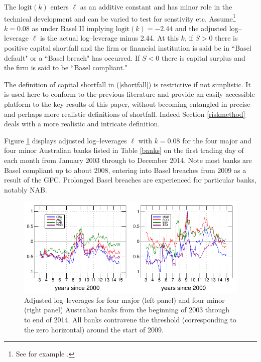 \documentclass[12pt]{article}
\newcommand{\logit}{\mathrm{logit}}
\newcommand{\eref}[1]{(\ref{#1})}
\newcommand{\fref}[1]{Figure \ref{#1}}
\newcommand{\sref}[1]{Section \ref{#1}}
\newcommand{\tref}[1]{Table \ref{#1}}
\begin{document}
The $\logit(k)$ enters $\ell$ as an additive constant and has  minor role in the technical development and can be varied to test for senstivity etc.  Assume\footnote{See for example \cite{brownlees2015}.} $k=0.08$ as under Basel II implying $\logit( k)=-2.44$ and the adjusted log--leverage $\ell$ is the actual log--leverage minus 2.44.  At this $k$, if $S>0$ there is positive capital shortfall and  the firm or financial institution is said be in ``Basel default" or a ``Basel breach" has occurred.   If $S<0$ there is capital surplus and  the firm is said to be ``Basel compliant."

The definition of capital shortfall in \eref{shortfall} is restrictive if not simplistic.   It is used here to conform to the previous literature and provide an easily accessible  platform to the key results of this paper,  without becoming entangled in precise and perhaps more realistic definitions of shortfall.   Indeed \sref{riskmethod} deals with a more realistic and intricate definition.  

\fref{Bloglev} displays adjusted log--leverages $\ell$ with $ k=0.08$ for the four major and four minor Australian banks listed in \tref{banks} on the first trading day of each month from January 2003  through to December 2014.  Note most banks are Basel compliant up to about 2008, entering into Basel breaches from 2009 as a result of the GFC. Prolonged Basel breaches are experienced for particular banks, notably NAB.


\begin{figure}[htbp]
\begin{center}
\includegraphics[width=16cm]{figures/bloglev.pdf}
\caption{Adjusted log--leverages for four major (left panel) and four minor (right panel) Australian banks from the beginning of 2003 through to end of 2014.  All banks contravene the threshold (corresponding to the zero horizontal) around the start of 2009.}\label{Bloglev}
\end{center}
\end{figure}
\end{document}
